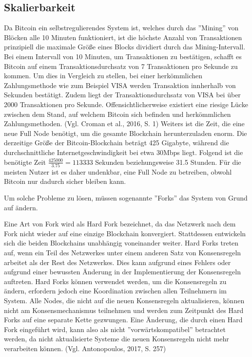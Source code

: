 \subsection{Skalierbarkeit}
Da Bitcoin ein selbstregulierendes System ist, welches durch das ''Mining'' von Blöcken alle 10 Minuten funktioniert, ist die
höchste Anzahl von Transaktionen prinzipiell die maximale Größe eines Blocks dividiert durch das Mining-Intervall. Bei einem
Intervall von 10 Minuten, um Transaktionen zu bestätigen, schafft es Bitcoin auf einem Transaktionsdurchsatz von 7 Transaktionen 
pro Sekunde zu kommen. Um dies in Vergleich zu stellen, bei einer herkömmlichen Zahlungsmethode wie zum Beispiel VISA werden
Transaktion innherhalb von Sekunden bestätigt. Zudem liegt der Transaktionsdurchsatz von VISA bei über 2000 Transaktionen pro
Sekunde. Offensichtlicherweise existiert eine riesige Lücke zwischen dem Stand, auf welchem Bitcoin sich befinden und
herkömmlichen Zahlungsmethoden. (Vgl. Croman et al., 2016, S. 1) Weiters ist die Zeit, die eine neue Full Node benötigt, um die gesamte 
Blockchain herunterzuladen enorm. Die derzeitige Größe der Bitcoin-Blockchain beträgt 425 Gigabyte, während die
durchschnittliche Internetgeschwindigkeit bei etwa 30Mbps liegt. Folgend ist die benötigte Zeit \(\frac{425000}{3.75} = 113333\)
Sekunden beziehungsweise 31.5 Stunden. Für die meisten Nutzer ist es daher undenkbar, eine Full Node zu betreiben, obwohl Bitcoin
nur dadurch sicher bleiben kann. 

Um solche Probleme zu lösen, müssen sogenannte ''Forks'' das System von Grund auf ändern.

Eine Art von Fork wird als Hard Fork bezeichnet, da das Netzwerk nach dem Fork nicht wieder auf eine einzige Blockchain 
konvergiert. Stattdessen entwickeln sich die beiden Blockchains unabhängig voneinander weiter. Hard Forks treten auf, wenn ein 
Teil des Netzwerkes unter einem anderen Satz von Konsensregeln arbeitet als der Rest des Netzwerkes. Dies kann aufgrund eines
Fehlers oder aufgrund einer bewussten Änderung in der Implementierung der Konsensregeln auftreten. Hard Forks können verwendet
werden, um die Konsensregeln zu ändern, erfordern jedoch eine Koordination zwischen allen Teilnehmern im System. Alle Nodes,
die nicht auf die neuen Konsensregeln aktualisieren, können nicht am Konsensmechanismus teilnehmen und werden zum Zeitpunkt des
Hard Forks auf eine separate Kette gezwungen. Eine Änderung, die durch einen Hard Fork eingeführt wird, kann also als nicht
''vorwärtskompatibel'' betrachtet werden, da nicht aktualisierte Systeme die neuen Konsensregeln nicht mehr verarbeiten können.
(Vgl. Antonopoulos, 2017, S. 257)

